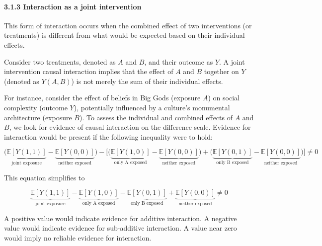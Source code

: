 \documentclass[
  singlecolumn]{article}
\let\oldparagraph\paragraph
\renewcommand{\paragraph}[1]{\oldparagraph{#1}\mbox{}}
\begin{document}
\paragraph{3.1.3 Interaction as a joint
intervention}\label{interaction-as-a-joint-intervention}

This form of interaction occurs when the combined effect of two
interventions (or treatments) is different from what would be expected
based on their individual effects.

Consider two treatments, denoted as \(A\) and \(B\), and their outcome
as \(Y\). A joint intervention causal interaction implies that the
effect of \(A\) and \(B\) together on \(Y\) (denoted as \(Y(A,B)\)) is
not merely the sum of their individual effects.

For instance, consider the effect of beliefs in Big Gods (exposure
\(A\)) on social complexity (outcome \(Y\)), potentially influenced by a
culture's monumental architecture (exposure \(B\)). To assess the
individual and combined effects of \(A\) and \(B\), we look for evidence
of causal interaction on the difference scale. Evidence for interaction
would be present if the following inequality were to hold:

\[\bigg(\underbrace{\mathbb{E}[Y(1,1)]}_{\text{joint exposure}} - \underbrace{\mathbb{E}[Y(0,0)]}_{\text{neither exposed}}\bigg) - \bigg[ \bigg(\underbrace{\mathbb{E}[Y(1,0)]}_{\text{only A exposed}} - \underbrace{\mathbb{E}[Y(0,0)]}_{\text{neither exposed}}\bigg) + \bigg(\underbrace{\mathbb{E}[Y(0,1)]}_{\text{only B exposed}} - \underbrace{\mathbb{E}[Y(0,0)]}_{\text{neither exposed}} \bigg)\bigg] \neq 0 \]

This equation simplifies to

\[ \underbrace{\mathbb{E}[Y(1,1)]}_{\text{joint exposure}} - \underbrace{\mathbb{E}[Y(1,0)]}_{\text{only A exposed}} - \underbrace{\mathbb{E}[Y(0,1)]}_{\text{only B exposed}} + \underbrace{\mathbb{E}[Y(0,0)]}_{\text{neither exposed}} \neq 0 \]

A positive value would indicate evidence for additive interaction. A
negative value would indicate evidence for sub-additive interaction. A
value near zero would imply no reliable evidence for interaction.
\end{document}
